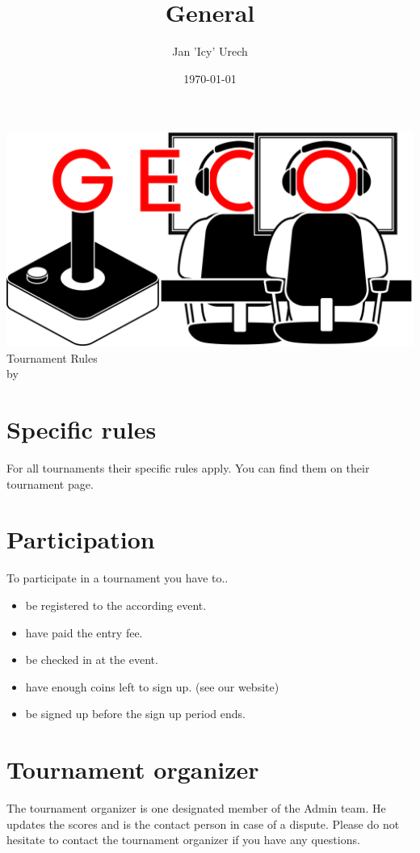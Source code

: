 \documentclass{article}
\title{General }
\author{Jan 'Icy' Urech}
\date{\today}
\begin{document}
\makeatletter
\begin{titlepage}
\centering
\includegraphics[scale=0.075]{GECo.png}\\
\LARGE \@title  Tournament Rules\\ \normalsize by \@author\\ \@date
\end{titlepage}
\makeatother


\clearpage

\tableofcontents
\clearpage


\section{Specific rules}
For all tournaments their specific rules apply. You can find them on their tournament page.



\section{Participation} 
To participate in a tournament you have to..
\begin{itemize}
	\item be registered to the according event.
	\item have paid the entry fee.
	\item be checked in at the event.
	\item have enough coins left to sign up. (see our website)
	\item be signed up before the sign up period ends.
\end{itemize}

\section{Tournament organizer}
The tournament organizer is one designated member of the Admin team. He updates the scores and is the contact person in case of a dispute. Please do not hesitate to contact the tournament organizer if you have any questions.
\end{document}

